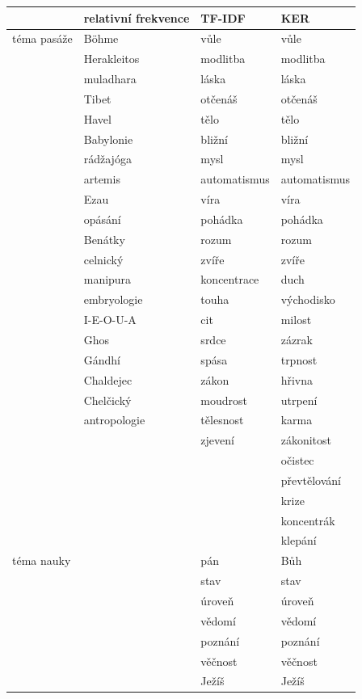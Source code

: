 \begin{table}[htpb]
\begin{center}
\begin{tabular}{|l|l|l|l|}
\hline
	& relativní frekvence & TF-IDF	& KER \\
\hline
téma pasáže 	& Böhme 	& vůle	& vůle \\
	& Herakleitos	& modlitba	& modlitba \\
	& muladhara	& láska	& láska \\
	& Tibet	& otčenáš	& otčenáš \\
	& Havel	& tělo	& tělo \\
	& Babylonie	& bližní	& bližní \\
	& rádžajóga	& mysl	& mysl \\
	& artemis	& automatismus	& automatismus \\
	& Ezau	& víra	& víra \\
	& opásání	& pohádka	& pohádka \\
	& Benátky	& rozum	& rozum \\
	& celnický	& zvíře	& zvíře \\
	& manipura	& koncentrace	& duch \\
	& embryologie	& touha	& východisko \\
	& I-E-O-U-A	& cit	& milost \\
	& Ghos	& srdce	& zázrak \\
	& Gándhí	& spása	& trpnost \\
	& Chaldejec	& zákon	& hřivna \\
	& Chelčický	& moudrost	& utrpení \\
	& antropologie	& tělesnost	& karma \\
	& 	& zjevení	& zákonitost \\
	& 	& 	& očistec \\
	& 	& 	& převtělování \\
	& 	& 	& krize \\
	& 	& 	& koncentrák \\
	& 	& 	& klepání \\
\hline
  téma nauky	& 	& pán	& Bůh \\
  	& 	& stav	& stav \\
  	& 	& úroveň	& úroveň \\
  	& 	& vědomí	& vědomí \\
  	& 	& poznání	& poznání \\
  	& 	& věčnost	& věčnost \\
  	& 	& Ježíš	& Ježíš \\

\end{tabular}
\end{center}
\end{table}
